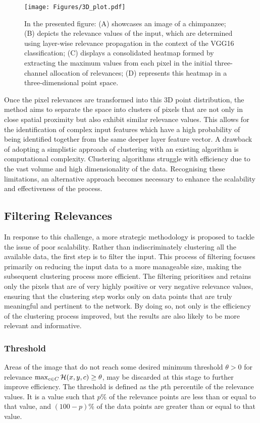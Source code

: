 \begin{figure}[ht!]
	\begin{center}
		\texttt{[image: Figures/3D\_plot.pdf]}
	\end{center}
	\caption{In the presented figure: (A) showcases an image of a chimpanzee; (B) depicts the relevance values of the input, which are determined using layer-wise relevance propagation in the context of the VGG16 classification; (C) displays a consolidated heatmap formed by extracting the maximum values from each pixel in the initial three-channel allocation of relevances; (D) represents this heatmap in a three-dimensional point space.}
	\label{Fig:3D}
\end{figure} 

Once the pixel relevances are transformed into this 3D point distribution, the method aims to separate the space into clusters of pixels that are not only in close spatial proximity but also exhibit similar relevance values. This allows for the identification of complex input features which have a high probability of being identified together from the same deeper layer feature vector. A drawback of adopting a simplistic approach of clustering with an existing algorithm is computational complexity. Clustering algorithms struggle with efficiency due to the vast volume and high dimensionality of the data. Recognising these limitations, an alternative approach becomes necessary to enhance the scalability and effectiveness of the process.

\subsection{Filtering Relevances}
In response to this challenge, a more strategic methodology is proposed to tackle the issue of poor scalability. Rather than indiscriminately clustering all the available data, the first step is to filter the input. This process of filtering focuses primarily on reducing the input data to a more manageable size, making the subsequent clustering process more efficient. The filtering prioritises and retains only the pixels that are of very highly positive or very negative relevance values, ensuring that the clustering step works only on data points that are truly meaningful and pertinent to the network. By doing so, not only is the efficiency of the clustering process improved, but the results are also likely to be more relevant and informative.
\subsubsection{Threshold}
Areas of the image that do not reach some desired minimum threshold $\theta>0$ for relevance $\max_{c\in C} \mathcal{H}(x,y,c)\geq \theta$, may be discarded at this stage to further improve efficiency. The threshold is defined as the $p$th percentile of the relevance values. It is a value such that  $p\%$ of the relevance points are less than or equal to that value, and $(100-p)\%$  of the data points are greater than or equal to that value.

